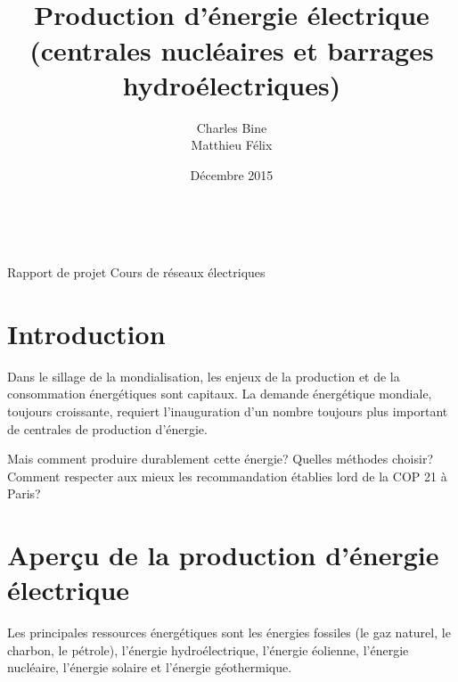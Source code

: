 \documentclass[12pt,a4paper,oneside,openany]{memoir}
\author{Charles Bine\\Matthieu Félix}
\title{\\Production d'énergie électrique (centrales nucléaires et barrages hydroélectriques)}
\date{Décembre 2015}
\begin{document}
	
\keepthetitle
\begin{titlingpage}
\noindent
\begin{minipage}[t]{0.4\textwidth} \begin{flushleft}
\theauthor \\ \thedate
\end{flushleft} \end{minipage}
\begin{minipage}[t]{0.4\textwidth} \begin{flushright}
Rapport de projet
Cours de réseaux électriques
\end{flushright} \end{minipage}

\vspace{3cm}
\begin{center}
{\LARGE \textsc{\thetitle}}
\end{center}
\vspace{3cm}

\end{titlingpage}

\addtolength{\marginparwidth}{11mm}
\abnormalparskip{4mm}

\clearpage

\tableofcontents
\listoffigures
\listoftables
\clearpage


\chapter{Introduction}

Dans le sillage de la mondialisation, les enjeux de la production et de la consommation énergétiques sont capitaux. La demande énergétique mondiale, toujours croissante, requiert l'inauguration d'un nombre toujours plus important de centrales de production d'énergie.

Mais comment produire durablement cette énergie? Quelles méthodes choisir? Comment respecter aux mieux les recommandation établies lord de la COP 21 à Paris? 


\chapter{Aperçu de la production d'énergie électrique}

Les principales ressources énergétiques sont les énergies fossiles (le gaz naturel, le charbon, le pétrole), l’énergie hydroélectrique, l’énergie éolienne, l’énergie nucléaire, l’énergie solaire et l'énergie géothermique. 
\end{document}
